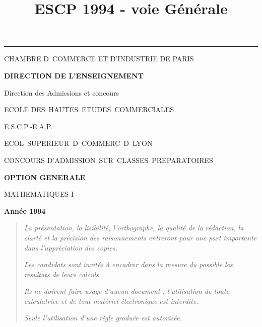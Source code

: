 \documentclass[11pt]{article}%
\title{\bf \vspace{-2cm} ESCP 1994 - voie Générale} %
\author{} %
\date{} %
\begin{document}
\maketitle %
\vspace{-1.4cm}\hrule %
\thispagestyle{fancy}

\vspace*{.2cm}




\begin{center}
{\small CHAMBRE D\E\ COMMERCE ET D'INDUSTRIE DE PARIS}

\textbf{DIRECTION DE L'ENSEIGNEMENT}

Direction des Admissions et concours

\underline{\hspace*{3cm}}

{\Large ECOLE DES\ HAUTES\ ETUDES\ COMMERCIALES}

{\Large E.S.C.P.-E.A.P.}

{\Large ECOL\E\ SUPERIEUR\E\ D\E\ COMMERC\E\ D\E\ LYON}{\large }

CONCOURS D'ADMISSION\ SUR\ CLASSES\ PREPARATOIRES

\underline{\hspace*{3cm}}

\textbf{OPTION GENERALE}

{\Large MATHEMATIQUES I}

\textbf{Année 1994}

\underline{\hspace*{3cm}}
\end{center}

\begin{quotation}
\noindent \textsl{La présentation, la lisibilité, l'orthographe, la
qualité
de la rédaction, la clarté et la précision des raisonnements entreront
pour
une part importante dans l'appréciation des copies.}

\noindent \textsl{Les candidats sont invités à encadrer dans la mesure
du
possible les résultats de leurs calculs.}

\noindent \textsl{Ils ne doivent faire usage d'aucun document :
l'utilisation de toute calculatrice et de tout matériel électronique
est
interdite.}

\noindent \textsl{Seule l'utilisation d'une règle graduée est
autorisée.}

\noindent \textsl{\hrulefill }
\end{quotation}
\end{document}
